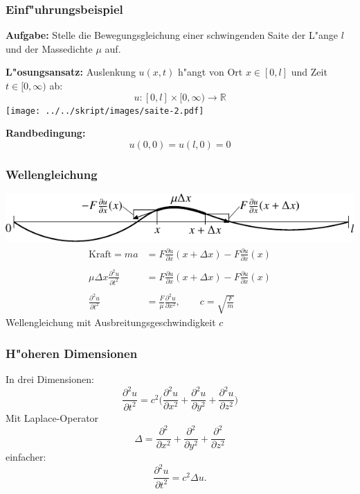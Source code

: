 \begin{frame}
\frametitle{Einf"uhrungsbeispiel}

{\bf Aufgabe:} Stelle die Bewegungsgleichung
einer schwingenden Saite der L"ange $l$ und der Massedichte $\mu$ auf.

\medskip
\pause
{\bf L"osungsansatz:}
Auslenkung $ u(x,t)$ h"angt von Ort $x\in[0,l]$ und Zeit $t\in[0,\infty)$
ab:
\[
u\colon [0,l]\times [0,\infty)\to \mathbb R
\]
\pause
\medskip
\texttt{[image: ../../skript/images/saite-2.pdf]}
\pause
\medskip

{\bf Randbedingung:}
\[
u(0,0)= u(l,0)=0
\]
\end{frame}


\begin{frame}
\frametitle{Wellengleichung}
\includegraphics{../../skript/images/saite-1.pdf}
\begin{align*}
\text{Kraft}
=ma
&=
F\frac{\partial u}{\partial x}(x+\Delta x)-F\frac{\partial u}{\partial x}(x)
\\
\\
\mu \Delta x \frac{\partial^2  u}{\partial t^2}
&=
F\frac{\partial u}{\partial x}(x+\Delta x)-F\frac{\partial u}{\partial x}(x)
\\
\\
\frac{\partial^2  u}{\partial t^2}
&=
\frac{F}{\mu}
\frac{\partial^2 u}{\partial x^2},
\qquad
c=\sqrt{\frac{F}{m}}
\end{align*}
Wellengleichung mit Ausbreitungsgeschwindigkeit $c$
\end{frame}

\begin{frame}
\frametitle{H"oheren Dimensionen}
In drei Dimensionen:
\[
\frac{\partial^2 u}{\partial t^2}=c^2
\biggl(
\frac{\partial^2 u}{\partial x^2}
+
\frac{\partial^2 u}{\partial y^2}
+
\frac{\partial^2 u}{\partial z^2}
\biggr)
\]
\pause
Mit Laplace-Operator
\[
\Delta
=
\frac{\partial^2}{\partial x^2}
+
\frac{\partial^2}{\partial y^2}
+
\frac{\partial^2}{\partial z^2}
\]
\pause
einfacher:
\[
\frac{\partial^2 u}{\partial t^2}
=
c^2\Delta  u.
\]
\end{frame}


